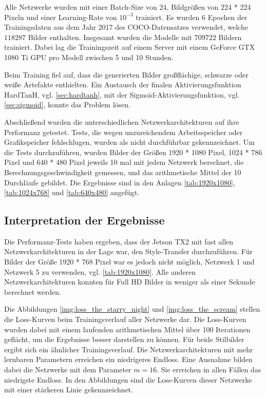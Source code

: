 Alle Netzwerke wurden mit einer Batch-Size von $ 24 $, Bildgrößen von 224 * 224 Pixeln und einer Learning-Rate von $ 10^{-3} $ trainiert. Es wurden 6 Epochen der Trainingsdaten aus dem Jahr 2017 des COCO-Datensatzes verwendet, welche $ 118287 $ Bilder enthalten. Insgesamt wurden die Modelle mit $ 709722 $ Bildern trainiert. Dabei lag die Trainingszeit auf einem Server mit einem GeForce GTX 1080 Ti GPU pro Modell zwischen 5 und 10 Stunden.

Beim Training fiel auf, dass die generierten Bilder großflächige, schwarze oder weiße Artefakte enthielten. Ein Austausch der finalen Aktivierungsfunktion HardTanH, vgl. \ref{sec:hardtanh}, mit der Sigmoid-Aktivierungsfunktion, vgl. \ref{sec:sigmoid}, konnte das Problem lösen.

Abschließend wurden die unterschiedlichen Netzwerkarchitekturen auf ihre Performanz getestet. Tests, die wegen unzureichendem Arbeitsspeicher oder Grafikspeicher fehlschlugen, wurden als \textcolor{danger}{nicht durchführbar} gekennzeichnet. Um die Tests durchzuführen, wurden Bilder der Größen 1920 * 1080 Pixel, 1024 * 786 Pixel und 640 * 480 Pixel jeweils 10 mal mit jedem Netzwerk berechnet, die Berechnungsgeschwindigkeit gemessen, und das arithmetische Mittel der 10 Durchläufe gebildet. Die Ergebnisse sind in den Anlagen \ref{tab:1920x1080}, \ref{tab:1024x768} und \ref{tab:640x480} angefügt.

\subsection{Interpretation der Ergebnisse}

Die Performanz-Tests haben ergeben, dass der Jetson TX2 mit fast allen Netzwerkarchitekturen in der Lage war, den Style-Transfer durchzuführen. Für Bilder der Größe 1920 * 768 Pixel war es jedoch nicht möglich, Netzwerk 1 und Netzwerk 5 zu verwenden, vgl. \ref{tab:1920x1080}. Alle anderen Netzwerkarchitekturen konnten für Full HD Bilder in weniger als einer Sekunde berechnet werden.

Die Abbildungen \ref{img:loss_the_starry_night} und \ref{img:loss_the_scream} stellen die Loss-Kurven beim Trainingsverlauf aller Netzwerke dar. Die Loss-Kurven wurden dabei mit einem laufenden arithmetischen Mittel über 100 Iterationen geflächt, um die Ergebnisse besser darstellen zu können. Für beide Stilbilder ergibt sich ein ähnlicher Trainingsverlauf. Die Netzwerkarchitekturen mit mehr lernbaren Parametern erreichen ein niedrigeres Endloss. Eine Ausnahme bilden dabei die Netzwerke mit dem Parameter $ m = 16 $. Sie erreichen in allen Fällen das niedrigste Endloss. In den Abbildungen sind die Loss-Kurven dieser Netzwerke mit einer stärkeren Linie gekennzeichnet.

